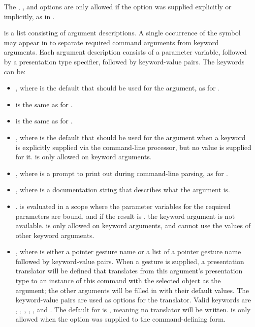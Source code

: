 The , , and  options are only allowed if
the  option was supplied explicitly or implicitly, as in
\DefineFrameCommand.

 is a list consisting of argument descriptions.  A single occurrence of
the symbol \cl{\key} may appear in  to separate required command arguments
from keyword arguments.  Each argument description consists of a parameter
variable, followed by a presentation type specifier, followed by keyword-value
pairs.  The keywords can be:

\begin{itemize}
\item {} , where  is the default that should
be used for the argument, as for .

\item {} is the same as for .

\item {} is the same as for .

\item {} , where  is the default
that should be used for the argument when a keyword is explicitly supplied via
the command-line processor, but no value is supplied for it.
 is only allowed on keyword arguments.

\item {} , where  is a prompt to print out
during command-line parsing, as for .

\item {} , where  is a documentation
string that describes what the argument is.

\item {} .   is evaluated in a scope where the
parameter variables for the required parameters are bound, and if the result is
, the keyword argument is not available.   is only allowed on
keyword arguments, and  cannot use the values of other keyword
arguments.

\item {} , where  is either a pointer
gesture name or a list of a pointer gesture name followed by keyword-value
pairs.  When a gesture is supplied, a presentation translator will be defined
that translates from this argument's presentation type to an instance of this
command with the selected object as the argument; the other arguments will be
filled in with their default values.  The keyword-value pairs are used as
options for the translator.  Valid keywords are , ,
, , , and
.  The default for  is , meaning
no translator will be written.   is only allowed when the
 option was supplied to the command-defining form.
\end{itemize}

